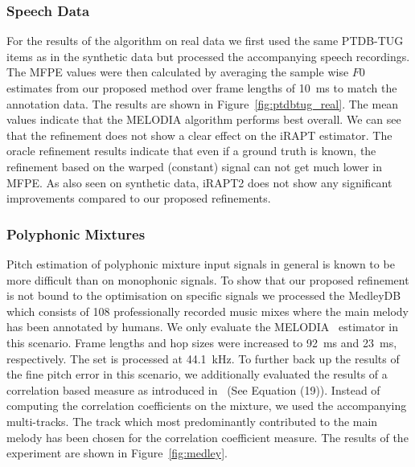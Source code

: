 \vspace{-0.6em}
\subsubsection{Speech Data} %
\label{ssub:real_data}
For the results of the algorithm on real data we first used the same PTDB-TUG items as in the synthetic data but processed the accompanying speech recordings. The MFPE values were then calculated by averaging the sample wise $F0$ estimates from our proposed method over frame lengths of 10~ms to match the annotation data. The results are shown in Figure~\ref{fig:ptdbtug_real}. The mean values indicate that the MELODIA algorithm performs best overall. We can see that the refinement does not show a clear effect on the iRAPT estimator. The oracle refinement results indicate that even if a ground truth is known, the refinement based on the warped (constant) signal can not get much lower in MFPE. As also seen on synthetic data, iRAPT2 does not show any significant improvements compared to our proposed refinements.

\vspace{-0.6em}
\subsubsection{Polyphonic Mixtures} %
\label{ssub:real_data}

Pitch estimation of polyphonic mixture input signals in general is known to be more difficult than on monophonic signals. To show that our proposed refinement is not bound to the optimisation on specific signals we processed the \mbox{MedleyDB}~\cite{MedleyDB} which consists of 108 professionally recorded music mixes where the main melody has been annotated by humans. We only evaluate the MELODIA~\cite{salamon2014melody} estimator in this scenario. Frame lengths and hop sizes were increased to 92~ms and 23~ms, respectively. The set is processed at 44.1~kHz. To further back up the results of the fine pitch error in this scenario, we additionally evaluated the results of a correlation based measure as introduced in~\cite{resch} (See Equation (19)). Instead of computing the correlation coefficients on the mixture, we used the accompanying multi-tracks. The track which most predominantly contributed to the main melody has been chosen for the correlation coefficient measure. The results of the experiment are shown in Figure~\ref{fig:medley}.

